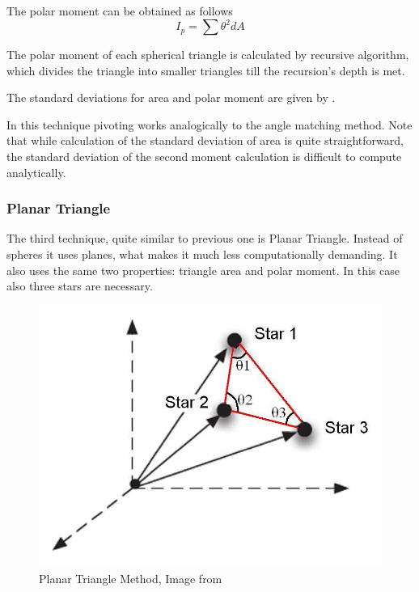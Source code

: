 \documentclass[12pt,a4paper,twoside]{article}
\begin{document}
The polar moment can be obtained as follows
\begin{equation}
I_p = \sum\theta^2dA
\end{equation}

The polar moment of each spherical triangle is calculated by recursive algorithm, which divides the triangle into smaller triangles till the recursion's depth is met.

The standard deviations for area and polar moment are given by \citet{cole2004fast}.

In this technique pivoting works analogically to the angle matching method. Note that while calculation of the standard deviation of area is quite straightforward, the standard deviation of the second moment calculation is difficult to compute analytically.

\subsubsection{Planar Triangle}

The third technique, quite similar to previous one is Planar Triangle. Instead of spheres it uses planes, what makes it much less computationally demanding. It also uses the same two properties: triangle area and polar moment. In this case also three stars are necessary\cite{cole2006fast}.

\begin{figure}[ht]
\includegraphics[scale=0.30]{planar_triangle_method.jpg}
\centering
\caption[Planar Triangle Method]{Planar Triangle Method, Image from \citet{cole2006fast}}
\label{fig:planar_triangle_method}
\end{figure}
\end{document}
